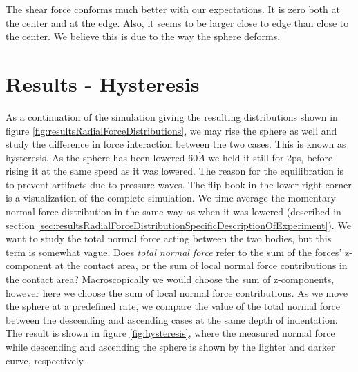 \documentclass[twoside,english]{uiofysmaster}
\begin{document}
 The shear force conforms much better with our expectations.
 It is zero both at the center and at the edge. 
 Also, it seems to be larger close to edge than close to the center. 
 We believe this is due to the way the sphere deforms. 
 
 


\section{Results - Hysteresis}
As a continuation of the simulation giving the resulting distributions shown in figure \ref{fig:resultsRadialForceDistributions}, we may rise the sphere as well and study the difference in force interaction between the two cases. 
This is known as hysteresis.
As the sphere has been lowered $60\mathring{A}$ we held it still for 2ps, before rising it at the same speed as it was lowered. 
The reason for the equilibration is to prevent artifacts due to pressure waves. 
The flip-book in the lower right corner is a visualization of the complete simulation. 
We time-average the momentary normal force distribution in the same way as when it was lowered (described in section \ref{sec:resultsRadialForceDistributionSpecificDescriptionOfExperiment}).
We want to study the total normal force acting between the two bodies, but this term is somewhat vague. 
Does \textit{total normal force} refer to the sum of the forces' z-component at the contact area, or the sum of local normal force contributions in the contact area? 
Macroscopically we would choose the sum of z-components, however here we choose the sum of local normal force contributions.
As we move the sphere at a predefined rate, we compare the value of the total normal force between the descending and ascending cases at the same depth of indentation.  
The result is shown in figure \ref{fig:hysteresis}, where the measured normal force while descending and ascending the sphere is shown by the lighter and darker curve, respectively. 
\end{document}
